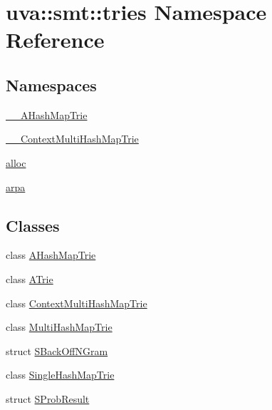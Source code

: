 \hypertarget{namespaceuva_1_1smt_1_1tries}{}\section{uva\+:\+:smt\+:\+:tries Namespace Reference}
\label{namespaceuva_1_1smt_1_1tries}
\subsection*{Namespaces}
\begin{DoxyCompactItemize}
\item 
 \hyperlink{namespaceuva_1_1smt_1_1tries_1_1_____a_hash_map_trie}{\+\_\+\+\_\+\+A\+Hash\+Map\+Trie}
\item 
 \hyperlink{namespaceuva_1_1smt_1_1tries_1_1_____context_multi_hash_map_trie}{\+\_\+\+\_\+\+Context\+Multi\+Hash\+Map\+Trie}
\item 
 \hyperlink{namespaceuva_1_1smt_1_1tries_1_1alloc}{alloc}
\item 
 \hyperlink{namespaceuva_1_1smt_1_1tries_1_1arpa}{arpa}
\end{DoxyCompactItemize}
\subsection*{Classes}
\begin{DoxyCompactItemize}
\item 
class \hyperlink{classuva_1_1smt_1_1tries_1_1_a_hash_map_trie}{A\+Hash\+Map\+Trie}
\item 
class \hyperlink{classuva_1_1smt_1_1tries_1_1_a_trie}{A\+Trie}
\item 
class \hyperlink{classuva_1_1smt_1_1tries_1_1_context_multi_hash_map_trie}{Context\+Multi\+Hash\+Map\+Trie}
\item 
class \hyperlink{classuva_1_1smt_1_1tries_1_1_multi_hash_map_trie}{Multi\+Hash\+Map\+Trie}
\item 
struct \hyperlink{structuva_1_1smt_1_1tries_1_1_s_back_off_n_gram}{S\+Back\+Off\+N\+Gram}
\item 
class \hyperlink{classuva_1_1smt_1_1tries_1_1_single_hash_map_trie}{Single\+Hash\+Map\+Trie}
\item 
struct \hyperlink{structuva_1_1smt_1_1tries_1_1_s_prob_result}{S\+Prob\+Result}
\end{DoxyCompactItemize}
